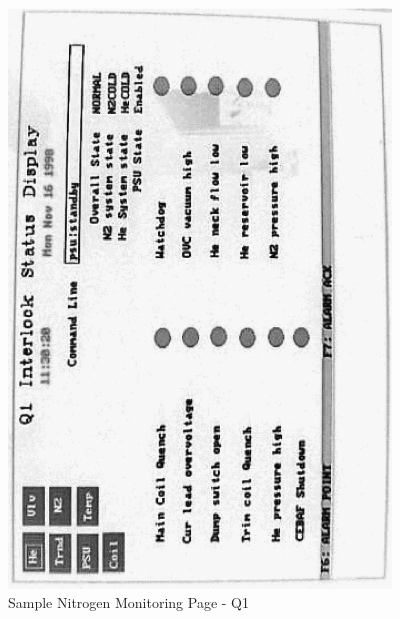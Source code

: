 \begin{center}
\begin{figure}
\includegraphics[angle=-90,width=4in]{spectrometers/Q1-interlock.ps}
\caption{Sample Nitrogen Monitoring Page - Q1\label{fig:nit_page}}
\end{figure}


\end{center}

